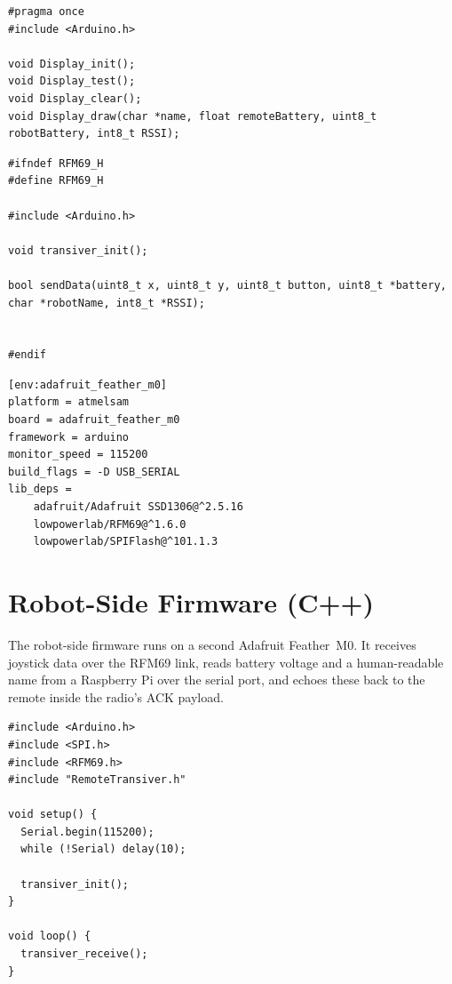 \begin{lstlisting}[style=appendix, caption={Remote --- OledDis.h}, label={lst:remote-oled-h}]
#pragma once
#include <Arduino.h>

void Display_init();
void Display_test();
void Display_clear();
void Display_draw(char *name, float remoteBattery, uint8_t robotBattery, int8_t RSSI);
\end{lstlisting}

\begin{lstlisting}[style=appendix, caption={Remote --- RadioTrans.h}, label={lst:remote-radio-h}]
#ifndef RFM69_H
#define RFM69_H

#include <Arduino.h>

void transiver_init();

bool sendData(uint8_t x, uint8_t y, uint8_t button, uint8_t *battery, char *robotName, int8_t *RSSI);


#endif
\end{lstlisting}

\begin{lstlisting}[style=appendix-ini, caption={Remote --- platformio.ini}, label={lst:remote-pio}]
[env:adafruit_feather_m0]
platform = atmelsam
board = adafruit_feather_m0
framework = arduino
monitor_speed = 115200
build_flags = -D USB_SERIAL
lib_deps = 
	adafruit/Adafruit SSD1306@^2.5.16
	lowpowerlab/RFM69@^1.6.0
	lowpowerlab/SPIFlash@^101.1.3
\end{lstlisting}

\section{Robot-Side Firmware (C++)}

The robot-side firmware runs on a second Adafruit Feather~M0.  It receives
joystick data over the RFM69 link, reads battery voltage and a human-readable
name from a Raspberry Pi over the serial port, and echoes these back to the
remote inside the radio's ACK payload.

\begin{lstlisting}[style=appendix, caption={Robot --- main.cpp}, label={lst:robot-main}]
#include <Arduino.h>
#include <SPI.h>
#include <RFM69.h>
#include "RemoteTransiver.h"

void setup() {
  Serial.begin(115200);
  while (!Serial) delay(10);

  transiver_init();
}

void loop() {
  transiver_receive();
}
\end{lstlisting}

